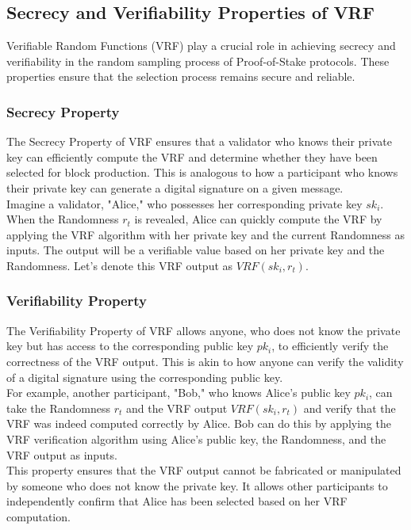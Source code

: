 \subsection{Secrecy and Verifiability Properties of VRF}
Verifiable Random Functions (VRF) play a crucial role in achieving secrecy and verifiability in the random sampling process of Proof-of-Stake protocols. These properties ensure that the selection process remains secure and reliable.

\subsubsection{Secrecy Property}
The Secrecy Property of VRF ensures that a validator who knows their private key can efficiently compute the VRF and determine whether they have been selected for block production. This is analogous to how a participant who knows their private key can generate a digital signature on a given message.\\
Imagine a validator, "Alice," who possesses her corresponding private key $sk_i$. When the Randomness $r_t$ is revealed, Alice can quickly compute the VRF by applying the VRF algorithm with her private key and the current Randomness as inputs. The output will be a verifiable value based on her private key and the Randomness. Let's denote this VRF output as $VRF(sk_i, r_t)$.

\subsubsection{Verifiability Property}
The Verifiability Property of VRF allows anyone, who does not know the private key but has access to the corresponding public key $pk_i$, to efficiently verify the correctness of the VRF output. This is akin to how anyone can verify the validity of a digital signature using the corresponding public key.\\
For example, another participant, "Bob," who knows Alice's public key $pk_i$, can take the Randomness $r_t$ and the VRF output $VRF(sk_i, r_t)$ and verify that the VRF was indeed computed correctly by Alice. Bob can do this by applying the VRF verification algorithm using Alice's public key, the Randomness, and the VRF output as inputs.\\
This property ensures that the VRF output cannot be fabricated or manipulated by someone who does not know the private key. It allows other participants to independently confirm that Alice has been selected based on her VRF computation.

